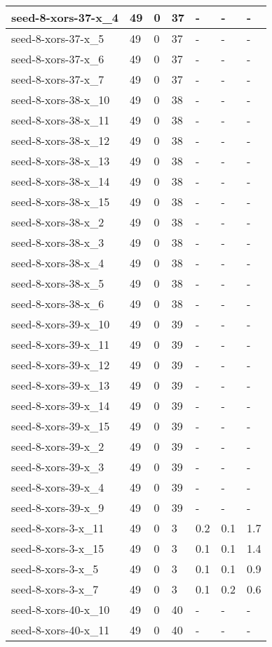 \begin{scriptsize}
\begin{longtable}{|p{5cm}|l|l|l|l|l|l|}
seed-8-xors-37-x\_4&49&0&37&-&-&- \\ \hline 
seed-8-xors-37-x\_5&49&0&37&-&-&- \\ \hline 
seed-8-xors-37-x\_6&49&0&37&-&-&- \\ \hline 
seed-8-xors-37-x\_7&49&0&37&-&-&- \\ \hline 
seed-8-xors-38-x\_10&49&0&38&-&-&- \\ \hline 
seed-8-xors-38-x\_11&49&0&38&-&-&- \\ \hline 
seed-8-xors-38-x\_12&49&0&38&-&-&- \\ \hline 
seed-8-xors-38-x\_13&49&0&38&-&-&- \\ \hline 
seed-8-xors-38-x\_14&49&0&38&-&-&- \\ \hline 
seed-8-xors-38-x\_15&49&0&38&-&-&- \\ \hline 
seed-8-xors-38-x\_2&49&0&38&-&-&- \\ \hline 
seed-8-xors-38-x\_3&49&0&38&-&-&- \\ \hline 
seed-8-xors-38-x\_4&49&0&38&-&-&- \\ \hline 
seed-8-xors-38-x\_5&49&0&38&-&-&- \\ \hline 
seed-8-xors-38-x\_6&49&0&38&-&-&- \\ \hline 
seed-8-xors-39-x\_10&49&0&39&-&-&- \\ \hline 
seed-8-xors-39-x\_11&49&0&39&-&-&- \\ \hline 
seed-8-xors-39-x\_12&49&0&39&-&-&- \\ \hline 
seed-8-xors-39-x\_13&49&0&39&-&-&- \\ \hline 
seed-8-xors-39-x\_14&49&0&39&-&-&- \\ \hline 
seed-8-xors-39-x\_15&49&0&39&-&-&- \\ \hline 
seed-8-xors-39-x\_2&49&0&39&-&-&- \\ \hline 
seed-8-xors-39-x\_3&49&0&39&-&-&- \\ \hline 
seed-8-xors-39-x\_4&49&0&39&-&-&- \\ \hline 
seed-8-xors-39-x\_9&49&0&39&-&-&- \\ \hline 
seed-8-xors-3-x\_11&49&0&3&0.2&0.1&1.7 \\ \hline 
seed-8-xors-3-x\_15&49&0&3&0.1&0.1&1.4 \\ \hline 
seed-8-xors-3-x\_5&49&0&3&0.1&0.1&0.9 \\ \hline 
seed-8-xors-3-x\_7&49&0&3&0.1&0.2&0.6 \\ \hline 
seed-8-xors-40-x\_10&49&0&40&-&-&- \\ \hline 
seed-8-xors-40-x\_11&49&0&40&-&-&- \\ \hline 

\end{longtable}
\end{scriptsize}
